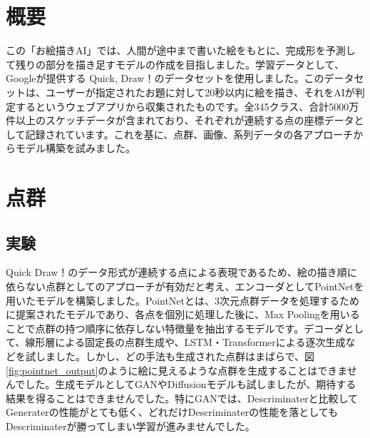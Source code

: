\section{概要}

この「お絵描きAI」では、人間が途中まで書いた絵をもとに、完成形を予測して残りの部分を描き足すモデルの作成を目指しました。学習データとして、Googleが提供する Quick, Draw！\cite{quickdraw}のデータセットを使用しました。このデータセットは、ユーザーが指定されたお題に対して20秒以内に絵を描き、それをAIが判定するというウェブアプリから収集されたものです。全345クラス、合計5000万件以上のスケッチデータが含まれており、それぞれが連続する点の座標データとして記録されています。これを基に、点群、画像、系列データの各アプローチからモデル構築を試みました。

\section{点群}
\subsection{実験}
Quick Draw！\cite{quickdraw}のデータ形式が連続する点による表現であるため、絵の描き順に依らない点群としてのアプローチが有効だと考え、エンコーダとしてPointNet\cite{pointnet}を用いたモデルを構築しました。PointNet\cite{pointnet}とは、3次元点群データを処理するために提案されたモデルであり、各点を個別に処理した後に、Max Poolingを用いることで点群の持つ順序に依存しない特徴量を抽出するモデルです。デコーダとして、線形層による固定長の点群生成や、LSTM・Transformerによる逐次生成などを試しました。しかし、どの手法も生成された点群はまばらで、図\ref{fig:pointnet_output}のように絵に見えるような点群を生成することはできませんでした。生成モデルとしてGANやDiffusionモデルも試しましたが、期待する結果を得ることはできませんでした。特にGANでは、Descriminaterと比較してGeneraterの性能がとても低く、どれだけDescriminaterの性能を落としてもDescriminaterが勝ってしまい学習が進みませんでした。

